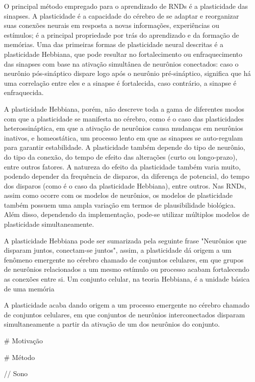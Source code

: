 O principal método empregado para o aprendizado de RNDs é a plasticidade das sinapses. A plasticidade é a capacidade do cérebro de
se adaptar e reorganizar suas conexões neurais em resposta a novas informações, experiências ou estímulos; é a principal
propriedade por trás do aprendizado e da formação de memórias. Uma das primeiras formas de plasticidade neural descritas é a
plasticidade Hebbiana, que pode resultar no fortalecimento ou enfraquecimento das sinapses com base na ativação simultânea de
neurônios conectados: caso o neurônio pós-sináptico dispare logo após o neurônio pré-sináptico, significa que há uma correlação
entre eles e a sinapse é fortalecida, caso contrário, a sinapse é enfraquecida.

A plasticidade Hebbiana, porém, não descreve toda a gama de diferentes modos com que a plasticidade se manifesta no cérebro, como
é o caso das  plasticidades heterossináptica, em que a ativação de neurônios causa mudanças em neurônios inativos, e homeostática,
um processo lento em que as sinapses se auto-regulam para garantir estabilidade. A plasticidade também
depende do tipo de neurônio, do tipo da conexão, do tempo de efeito das alterações (curto ou longo-prazo), entre outros fatores. A
natureza do efeito da plasticidade também varia muito, podendo depender da frequência de disparos, da diferença de potencial, do
tempo dos disparos (como é o caso da plasticidade Hebbiana), entre outros. Nas RNDs, assim como ocorre com os modelos de
neurônios, os modelos de plasticidade também possuem uma ampla variação em termos de plausibilidade biológica. Além disso,
dependendo da implementação, pode-se utilizar múltiplos modelos de plasticidade simultaneamente.

A plasticidade Hebbiana pode ser sumarizada pela seguinte frase "Neurônios que disparam juntos, conectam-se juntos", assim, a
plasticidade dá origem a um fenômeno emergente no cérebro chamado de conjuntos celulares, em que grupos de neurônios relacionados
a um mesmo estímulo ou processo acabam fortalecendo as conexões entre si. Um conjunto celular, na teoria Hebbiana, é a unidade
básica de uma memória

A plasticidade acaba dando origem a um processo emergente no cérebro chamado de conjuntos celulares, em que conjuntos de neurônios
interconectados disparam simultaneamente a partir da ativação de um dos neurônios do conjunto.


# Motivação

# Método

// Sono

